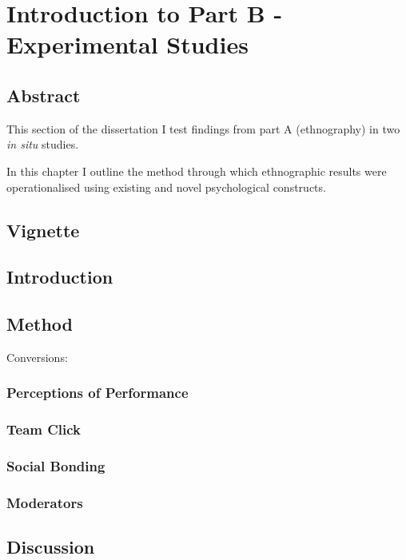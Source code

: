 \chapter{\label{partBintroMethod}Introduction to Part B - Experimental Studies}


  \minitoc


\section{Abstract}

This section of the dissertation I test findings from part A (ethnography) in two \textit{in situ} studies.

In this chapter I outline the method through which ethnographic results were operationalised using existing and novel psychological constructs.

\section{Vignette}



\section{Introduction}



\section{Method}

Conversions:

\subsection{Perceptions of Performance}
\subsection{Team Click}
\subsection{Social Bonding}
\subsection{Moderators}




\section{Discussion}

